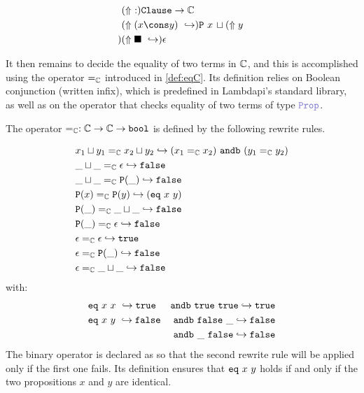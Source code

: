 \begin{definition}
\begin{align*}
& \reify{}: \texttt{Clause} \ra \bb{C} \\
&\reify{(x \cons y)} \re \kw{P}~x \,\sqcup \reify{y} \\
&\reify{ \blacksquare } \re \epsilon \\
\end{align*}
\label{def:reify-def}
\end{definition}

It then remains to decide the equality of two terms in $\mathbb{C}$, and this is accomplished using the operator $=_\mathbb{C}$ introduced in \cref{def:eqC}.
Its definition relies on Boolean conjunction  (written infix), which is predefined in Lambdapi's standard library, as well as on the operator  that checks equality of two terms of type $\prop$.

\begin{definition}
The operator $=_\mathbb{C} : \mathbb{C} \rightarrow \mathbb{C} \rightarrow \texttt{\upshape{bool}}$ is defined by the following rewrite rules.

\begin{align*}
&x_1 \sqcup y_1 =_\mathbb{C} x_2 \sqcup y_2 \hookrightarrow (x_1  =_\mathbb{C} x_2) ~\texttt{\upshape{andb}}~ (y_1  =_\mathbb{C} y_2) \\
&\_ \sqcup \_ =_\mathbb{C} \epsilon \hookrightarrow \texttt{\upshape{false}} \\
&\_ \sqcup \_ =_\mathbb{C} \texttt{\upshape{P}}(\_) \hookrightarrow \texttt{\upshape{false}} \\
&\texttt{\upshape{P}}(x) =_\mathbb{C} \texttt{\upshape{P}}(y) \hookrightarrow (\texttt{\upshape{eq}}~x~y) \\
&\texttt{\upshape{P}}(\_) =_\mathbb{C} \_ \sqcup \_ \hookrightarrow \texttt{\upshape{false}} \\
&\texttt{\upshape{P}}(\_) =_\mathbb{C} \epsilon \hookrightarrow \texttt{\upshape{false}} \\
&\epsilon =_\mathbb{C} \epsilon \hookrightarrow \texttt{\upshape{true}} \\
&\epsilon =_\mathbb{C} \texttt{\upshape{P}}(\_) \hookrightarrow \texttt{\upshape{false}} \\
&\epsilon =_\mathbb{C} \_ \sqcup \_ \hookrightarrow \texttt{\upshape{false}}
\end{align*}
with:
\begin{align*}
&\texttt{\upshape{eq}}~x~x~ \hookrightarrow \texttt{\upshape{true}}  & \texttt{\upshape{andb}}~\texttt{\upshape{true}}~\texttt{\upshape{true}} \hookrightarrow \texttt{\upshape{true}} \\
&\texttt{\upshape{eq}}~x~y~ \hookrightarrow \texttt{\upshape{false}} & \texttt{\upshape{andb}}~\texttt{\upshape{false}}~\_ \hookrightarrow \texttt{\upshape{false}} \\
& & \texttt{\upshape{andb}}~\_~\texttt{\upshape{false}} \hookrightarrow \texttt{\upshape{false}}
\end{align*}
\label{def:eqC}
The binary operator  is declared as  so that the second rewrite rule will be applied only if the first one fails.
Its definition ensures that $\texttt{\upshape{eq}}~x~y$ holds if and only if the two propositions $x$ and $y$ are identical.
\end{definition}


